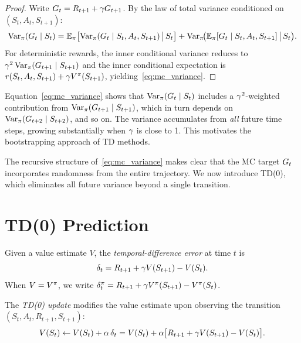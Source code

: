 \documentclass[11pt,a4paper]{article}
\begin{document}
\begin{proof}
Write $G_t = R_{t+1} + \gamma G_{t+1}$. By the law of total
variance conditioned on $(S_t, A_t, S_{t+1})$:
\[
  \operatorname{Var}_\pi(G_t \mid S_t)
  = \mathbb{E}_\pi\bigl[\operatorname{Var}_\pi(G_t \mid S_t, A_t, S_{t+1})
    \,\big|\, S_t\bigr]
  + \operatorname{Var}_\pi\!\bigl(\mathbb{E}_\pi[G_t \mid S_t, A_t, S_{t+1}]
    \,\big|\, S_t\bigr).
\]
For deterministic rewards, the inner conditional variance reduces to
$\gamma^2 \operatorname{Var}_\pi(G_{t+1} \mid S_{t+1})$ and the inner
conditional expectation is $r(S_t, A_t, S_{t+1}) + \gamma V^{\pi}(S_{t+1})$,
yielding~\eqref{eq:mc_variance}.
\end{proof}

\begin{warning}[title={MC Variance Accumulates Over the Entire Trajectory}]
Equation~\eqref{eq:mc_variance} shows that $\operatorname{Var}_\pi(G_t \mid
S_t)$ includes a $\gamma^2$-weighted contribution from
$\operatorname{Var}_\pi(G_{t+1} \mid S_{t+1})$, which in turn depends on
$\operatorname{Var}_\pi(G_{t+2} \mid S_{t+2})$, and so on. The variance
accumulates from \emph{all} future time steps, growing substantially
when $\gamma$ is close to 1. This motivates the bootstrapping
approach of TD methods.
\end{warning}

The recursive structure of~\eqref{eq:mc_variance} makes clear that the
MC target $G_t$ incorporates randomness from the entire trajectory.
We now introduce TD(0), which eliminates all future variance beyond
a single transition.

\section{TD(0) Prediction}
\label{sec:td0}

\begin{definition}[TD Error]
\label{def:td_error}
Given a value estimate $V$, the \emph{temporal-difference error} at
time $t$ is
\begin{equation}
  \delta_t = R_{t+1} + \gamma V(S_{t+1}) - V(S_t).
  \label{eq:td_error}
\end{equation}
When $V = V^{\pi}$, we write
$\delta_t^\pi = R_{t+1} + \gamma V^{\pi}(S_{t+1}) - V^{\pi}(S_t)$.
\end{definition}

\begin{definition}
\label{def:td0_update}
The \emph{TD(0) update} modifies the value estimate upon observing the
transition $(S_t, A_t, R_{t+1}, S_{t+1})$:
\begin{equation}
  V(S_t) \leftarrow V(S_t) + \alpha\,\delta_t
  = V(S_t) + \alpha\bigl[R_{t+1} + \gamma V(S_{t+1}) - V(S_t)\bigr].
  \label{eq:td0_update}
\end{equation}
\end{definition}
\end{document}
